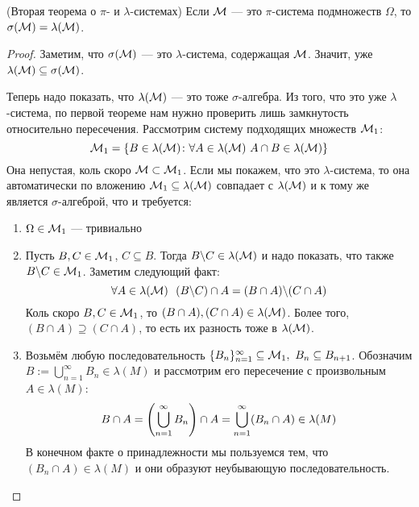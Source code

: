 \begin{theorem} (Вторая теорема о $\pi$- и $\lambda$-системах)
	Если $\mathcal{M}$ --- это $\pi$-система подмножеств $\Omega$, то $\sigma(\mathcal{M}) = \lambda(\mathcal{M})$.
\end{theorem}

\begin{proof}
	Заметим, что $\sigma(\mathcal{M})$ --- это $\lambda$-система, содержащая $\mathcal{M}$. Значит, уже $\lambda(\mathcal{M}) \subseteq \sigma(\mathcal{M})$.
	
	Теперь надо показать, что $\lambda(\mathcal{M})$ --- это тоже $\sigma$-алгебра. Из того, что это уже $\lambda$-система, по первой теореме нам нужно проверить лишь замкнутость относительно пересечения. Рассмотрим систему подходящих множеств $\mathcal{M}_1$:
	\[
		\mathcal{M}_1 = \{B \in \lambda(\mathcal{M}) \colon \forall A \in \lambda(\mathcal{M})\ A \cap B \in \lambda(\mathcal{M})\}
	\]
	Она непустая, коль скоро $\mathcal{M} \subset \mathcal{M}_1$. Если мы покажем, что это $\lambda$-система, то она автоматически по вложению $\mathcal{M}_1 \subseteq \lambda(\mathcal{M})$ совпадает с $\lambda(\mathcal{M})$ и к тому же является $\sigma$-алгеброй, что и требуется:
	\begin{enumerate}
		\item $\Omega \in \mathcal{M}_1$ --- тривиально
		
		\item Пусть $B, C \in \mathcal{M}_1$, $C \subseteq B$. Тогда $B \backslash C \in \lambda(\mathcal{M})$ и надо показать, что также $B \backslash C \in \mathcal{M}_1$. Заметим следующий факт:
		\[
			\forall A \in \lambda(\mathcal{M})\ \ (B \backslash C) \cap A = (B \cap A) \backslash (C \cap A)
		\]
		Коль скоро $B, C \in \mathcal{M}_1$, то $(B \cap A), (C \cap A) \in \lambda(\mathcal{M})$. Более того, $(B \cap A) \supseteq (C \cap A)$, то есть их разность тоже в $\lambda(\mathcal{M})$.
		
		\item Возьмём любую последовательность $\{B_n\}_{n = 1}^\infty \subseteq \mathcal{M}_1,\ B_n \subseteq B_{n + 1}$. Обозначим $B := \bigcup_{n = 1}^\infty B_n \in \lambda(M)$ и рассмотрим его пересечение с произвольным $A \in \lambda(M)$:
		\[
			B \cap A = \left(\bigcup_{n = 1}^\infty B_n\right) \cap A = \bigcup_{n = 1}^\infty (B_n \cap A) \in \lambda(M)
		\]
		В конечном факте о принадлежности мы пользуемся тем, что $(B_n \cap A) \in \lambda(M)$ и они образуют неубывающую последовательность.
	\end{enumerate}
\end{proof}